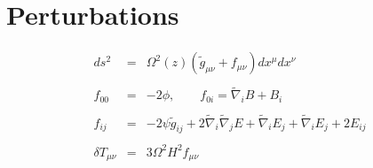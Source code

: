 \documentclass[10pt,letterpaper]{article}
\numberwithin{equation}{section}
\begin{document}
\section{Perturbations}
\begin{eqnarray}
ds^2 &=& \Omega^2(z)\left( \tilde g_{\mu\nu}+ f_{\mu\nu}\right) dx^\mu dx^\nu
\\ \nonumber\\
f_{00} &=& -2 \phi,\qquad f_{0i} = \tilde\nabla_i B + B_i
\\ \nonumber\\
f_{ij} &=& -2 \psi \tilde g_{ij} + 2\tilde\nabla_i\tilde\nabla_j E + \tilde\nabla_i E_j
+ \tilde\nabla_i E_j + 2E_{ij}
\\ \nonumber\\
\delta T_{\mu\nu} &=& 3\Omega^2 H^2 f_{\mu\nu}
\end{eqnarray}
%
\end{document}

